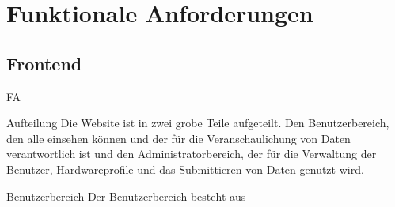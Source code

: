 \section{Funktionale Anforderungen}
\setcounter{counter}{10}
\subsection{Frontend}
\begin{Kriterien}{FA}

    \item[Aufteilung] Die Website ist in zwei grobe Teile aufgeteilt. Den Benutzerbereich, den alle einsehen können und der für die Veranschaulichung von Daten verantwortlich ist und den Administratorbereich, der für die Verwaltung der Benutzer, Hardwareprofile und das Submittieren von Daten genutzt wird.

    \item[Benutzerbereich] Der Benutzerbereich besteht aus 

\end{Kriterien}
